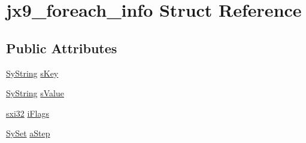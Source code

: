 \hypertarget{structjx9__foreach__info}{\section{jx9\-\_\-foreach\-\_\-info Struct Reference}
\label{d8/d1f/structjx9__foreach__info}
}
\subsection*{Public Attributes}
\begin{DoxyCompactItemize}
\item 
\hyperlink{struct_sy_string}{Sy\-String} \hyperlink{structjx9__foreach__info_ac93605cf200e6d48588b479b95de48c1}{s\-Key}
\item 
\hyperlink{struct_sy_string}{Sy\-String} \hyperlink{structjx9__foreach__info_a0704efed4d29d020f06f769a8036585e}{s\-Value}
\item 
\hyperlink{unqlite_8c_a5a58035d4ae379178e2ca46cc3272fc5}{sxi32} \hyperlink{structjx9__foreach__info_a7e07269c72e48c3ef53b9c91be64ea5b}{i\-Flags}
\item 
\hyperlink{struct_sy_set}{Sy\-Set} \hyperlink{structjx9__foreach__info_ae7f7dbcdea95f9fc00fe316ab3fb18fa}{a\-Step}
\end{DoxyCompactItemize}


